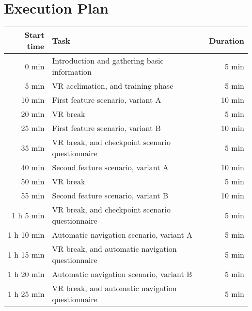 \section{Execution Plan}\label{sec:execution-plan}

\begin{center}
    \begin{tabular}{r l r}
        \toprule
        \textbf{Start time} & \textbf{Task} & \textbf{Duration} \\
        \midrule
             0 min & Introduction and gathering basic information     &  5 min \\
             5 min & VR acclimation, and training phase               &  5 min \\
        \midrule
            10 min & First feature scenario, variant A                & 10 min \\
            20 min & VR break                                         &  5 min \\
            25 min & First feature scenario, variant B                & 10 min \\
            35 min & VR break, and checkpoint scenario questionnaire  &  5 min \\
        \midrule
            40 min & Second feature scenario, variant A               & 10 min \\
            50 min & VR break                                         &  5 min \\
            55 min & Second feature scenario, variant B               & 10 min \\
        1 h  5 min & VR break, and checkpoint scenario questionnaire  &  5 min \\
        \midrule
        1 h 10 min & Automatic navigation scenario, variant A         &  5 min \\
        1 h 15 min & VR break, and automatic navigation questionnaire &  5 min \\
        1 h 20 min & Automatic navigation scenario, variant B         &  5 min \\
        1 h 25 min & VR break, and automatic navigation questionnaire &  5 min \\
        \bottomrule
    \end{tabular}
    \label{tab:execution-plan}
\end{center}

